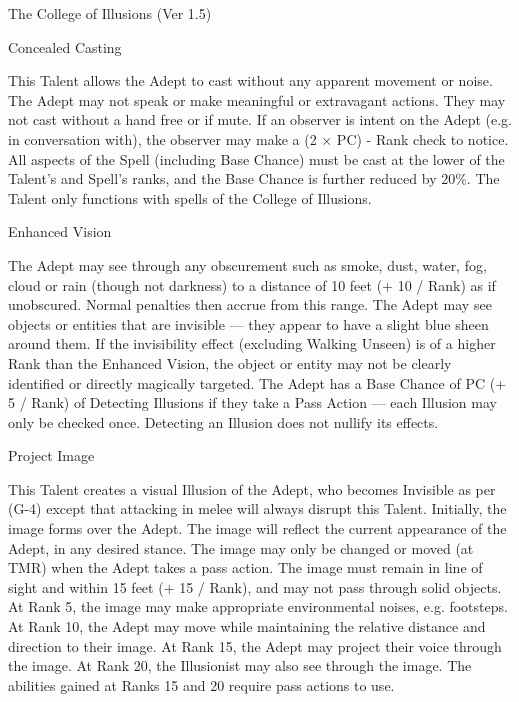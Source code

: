 \begin{Chapter}{The College of Illusions (Ver 1.5)}
\begin{talent}[T-1]{Concealed Casting}
\begin{effects}
This Talent allows the Adept to cast without any apparent movement or
noise.  The Adept may not speak or make meaningful or extravagant
actions. They may not cast without a hand free or if mute.  If an
observer is intent on the Adept (e.g. in conversation with), the
observer may make a (2 × PC) - Rank check to notice. All aspects of
the Spell (including Base Chance) must be cast at the lower of the
Talent’s and Spell’s ranks, and the Base Chance is further reduced by
20\%. The Talent only functions with spells of the College of
Illusions.
\end{effects}
\end{talent}

\begin{talent}[T-2]{Enhanced Vision}

\begin{effects}
The Adept may see through any obscurement such as smoke, dust, water,
fog, cloud or rain (though not darkness) to a distance of 10 feet (+
10 / Rank) as if unobscured.  Normal penalties then accrue from this
range. The Adept may see objects or entities that are invisible — they
appear to have a slight blue sheen around them.  If the invisibility
effect (excluding Walking Unseen) is of a higher Rank than the
Enhanced Vision, the object or entity may not be clearly identified or
directly magically targeted. The Adept has a Base Chance of PC (+ 5 /
Rank) of Detecting Illusions if they take a Pass Action --- each
Illusion may only be checked once.  Detecting an Illusion does not
nullify its effects.
\end{effects}
\end{talent}

\begin{talent}[T-3]{Project Image}

\begin{effects}
This Talent creates a visual Illusion of the Adept, who becomes
Invisible as per (G-4) except that attacking in melee will always
disrupt this Talent.  Initially, the image forms over the Adept.  The
image will reflect the current appearance of the Adept, in any desired
stance.  The image may only be changed or moved (at TMR) when the
Adept takes a pass action. The image must remain in line of sight and
within 15 feet (+ 15 / Rank), and may not pass through solid objects.
At Rank 5, the image may make appropriate environmental noises,
e.g. footsteps.  At Rank 10, the Adept may move while maintaining the
relative distance and direction to their image.  At Rank 15, the Adept
may project their voice through the image. At Rank 20, the Illusionist
may also see through the image.  The abilities gained at Ranks 15 and
20 require pass actions to use.
\end{effects}
\end{talent}


\end{Chapter}
